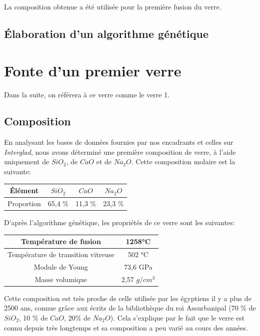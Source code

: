 \documentclass{article}
\begin{document}
La composition obtenue a été utilisée pour la première fusion du verre.

\subsection{Élaboration d'un algorithme génétique}

\section{Fonte d'un premier verre}

Dans la suite, on référera à ce verre comme le verre 1.
\subsection{Composition}

En analysant les bases de données fournies par nos encadrants et celles sur \textit{Interglad}, nous avons déterminé une première composition de verre, à l'aide uniquement de $SiO_2$, de $CaO$ et de $Na_2O$. Cette composition molaire est la suivante:

\begin{table}[ht]
\centering
\begin{tabular}{|c|c|c|c|}
    \hline
    Élément &  $SiO_2$ & $CaO$ & $Na_2O$ \\
    \hline
    Proportion & 65,4 \% & 11,3 \% & 23,3 \% \\
    \hline
    \end{tabular} 
\end{table}

D'après l'algorithme génétique, les propriétés de ce verre sont les suivantes:

\begin{table}[ht]
\centering
\begin{tabular}{|c|c|}
    \hline
    Température de fusion & 1258°C \\
    \hline
    Température de transition vitreuse & 502 °C \\
    \hline
    Module de Young & 73,6 GPa \\
    \hline
    Masse volumique & 2,57 $g/cm^{3}$ \\
    \hline
    \end{tabular}
\end{table}

Cette composition est très proche de celle utilisée par les égyptiens il y a plus de 2500 ans, connue grâce aux écrits de la bibliothèque du roi Assurbanipal  \cite{Horst} (70 \% de $SiO_2$, 10 \% de $CaO$, 20\% de $Na_2O$). Cela s'explique par le fait que le verre est connu depuis très longtemps et sa composition a peu varié au cours des années. 
\end{document}
